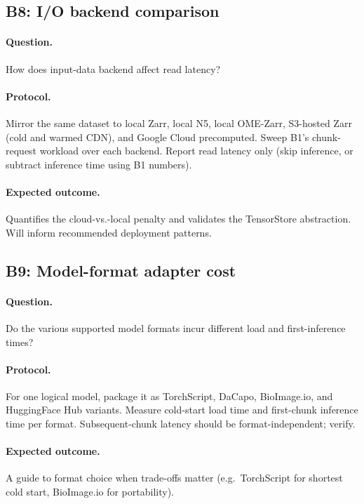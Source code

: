 \subsection*{B8: I/O backend comparison}

\paragraph{Question.} How does input-data backend affect read latency?

\paragraph{Protocol.} Mirror the same dataset to local Zarr, local N5, local OME-Zarr, S3-hosted Zarr (cold and warmed CDN), and Google Cloud precomputed. Sweep B1's chunk-request workload over each backend. Report read latency only (skip inference, or subtract inference time using B1 numbers).

\paragraph{Expected outcome.} Quantifies the cloud-vs.-local penalty and validates the TensorStore abstraction. Will inform recommended deployment patterns.

\subsection*{B9: Model-format adapter cost}

\paragraph{Question.} Do the various supported model formats incur different load and first-inference times?

\paragraph{Protocol.} For one logical model, package it as TorchScript, DaCapo, BioImage.io, and HuggingFace Hub variants. Measure cold-start load time and first-chunk inference time per format. Subsequent-chunk latency should be format-independent; verify.

\paragraph{Expected outcome.} A guide to format choice when trade-offs matter (e.g.\ TorchScript for shortest cold start, BioImage.io for portability).

